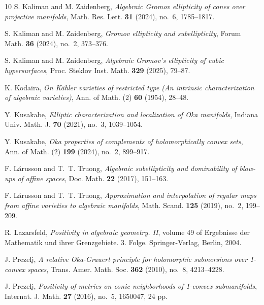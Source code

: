 \documentclass[12pt]{amsart}
\theoremstyle{definition}
\numberwithin{equation}{section}
\numberwithin{figure}{section}
\numberwithin{equation}{section}
\begin{document}
\begin{thebibliography}{10}
S. Kaliman and M. Zaidenberg,
\newblock \emph{Algebraic Gromov ellipticity of cones over projective manifolds},
\newblock Math. Res. Lett. \textbf{31} (2024), no.~6, 1785--1817.

S. Kaliman and M. Zaidenberg,
\newblock \emph{Gromov ellipticity and subellipticity},
\newblock Forum Math. \textbf{36} (2024), no.~2, 373--376.

S. Kaliman and M. Zaidenberg,
\newblock \emph{Algebraic Gromov's ellipticity of cubic hypersurfaces},
\newblock Proc. Steklov Inst. Math. \textbf{329} (2025), 79--87. 

K. Kodaira,
\newblock \emph{On K\"ahler varieties of restricted type (An intrinsic characterization of algebraic varieties)},
\newblock Ann. of Math. (2) \textbf{60} (1954), 28--48.

Y. Kusakabe,
\newblock \emph{Elliptic characterization and localization of Oka manifolds},
\newblock Indiana Univ. Math. J. \textbf{70} (2021), no.~3, 1039--1054.

Y. Kusakabe,
\newblock \emph{Oka properties of complements of holomorphically convex sets},
\newblock Ann. of Math. (2) \textbf{199} (2024), no.~2, 899--917.

F. L\'arusson and T.~T. Truong,
\newblock \emph{Algebraic subellipticity and dominability of blow-ups of affine spaces},
\newblock Doc. Math. \textbf{22} (2017), 151--163.

F. L\'arusson and T.~T. Truong,
\newblock \emph{Approximation and interpolation of regular maps from affine varieties to algebraic manifolds},
\newblock Math. Scand. \textbf{125} (2019), no.~2, 199--209.

R. Lazarsfeld,
\newblock \emph{Positivity in algebraic geometry. II},
\newblock volume 49 of Ergebnisse der Mathematik und ihrer Grenzgebiete. 3. Folge. Springer-Verlag, Berlin, 2004.

J. Prezelj,
\newblock \emph{A relative Oka-Grauert principle for holomorphic submersions over 1-convex spaces},
\newblock Trans. Amer. Math. Soc. \textbf{362} (2010), no.~8, 4213--4228.

J. Prezelj,
\newblock \emph{Positivity of metrics on conic neighborhoods of 1-convex submanifolds},
\newblock Internat. J. Math. \textbf{27} (2016), no.~5, 1650047, 24 pp.


\end{thebibliography}
\end{document}
